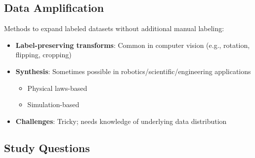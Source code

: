 \documentclass[12pt]{article}
\begin{document}
\subsection{Data Amplification}

\begin{tcolorbox}[colback=yellow!5!white,colframe=yellow!75!black,title={Data Amplification Techniques}]
Methods to expand labeled datasets without additional manual labeling:

\begin{itemize}
    \item \textbf{Label-preserving transforms}: Common in computer vision (e.g., rotation, flipping, cropping)
    \item \textbf{Synthesis}: Sometimes possible in robotics/scientific/engineering applications
    \begin{itemize}
        \item Physical laws-based
        \item Simulation-based
    \end{itemize}
    \item \textbf{Challenges}: Tricky; needs knowledge of underlying data distribution
\end{itemize}
\end{tcolorbox}

\subsection{Study Questions}
\end{document}
